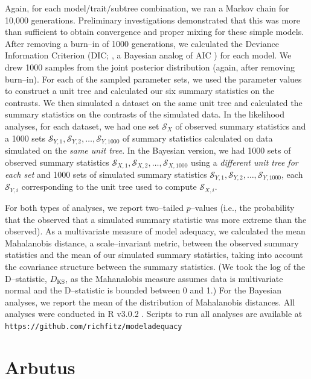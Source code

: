 \documentclass[a4paper,12pt]{article}
\begin{document}
Again, for each model/trait/subtree combination, we ran a Markov chain for 10,000 generations. Preliminary investigations demonstrated that this was more than sufficient to obtain convergence and proper mixing for these simple models. After removing a burn--in of 1000 generations, we calculated the Deviance Information Criterion (DIC; \citep{dic}, a Bayesian analog of AIC \citep{Gelman2013}) for each model. We drew 1000 samples from the joint posterior distribution (again, after removing burn--in). For each of the sampled parameter sets, we used the parameter values to construct a unit tree and calculated our six summary statistics on the contrasts. We then simulated a dataset on the same unit tree and calculated the summary statistics on the contrasts of the simulated data. In the likelihood analyses, for each dataset, we had one set $\mathcal{S}_X$ of observed summary statistics and a 1000 sets $\mathcal{S}_{Y,1}, \mathcal{S}_{Y,2}, \ldots, \mathcal{S}_{Y,1000}$ of summary statistics calculated on data simulated on the \emph{same unit tree}. In the Bayesian version, we had 1000 sets of observed summary statistics $\mathcal{S}_{X,1}, \mathcal{S}_{X,2}, \ldots, \mathcal{S}_{X,1000}$ using a \emph{different unit tree for each set} and 1000 sets of simulated summary statistics $\mathcal{S}_{Y,1}, \mathcal{S}_{Y,2}, \ldots, \mathcal{S}_{Y,1000}$, each $\mathcal{S}_{Y,i}$ corresponding to the unit tree used to compute $\mathcal{S}_{X,i}$.
 
For both types of analyses, we report two--tailed $p$--values (i.e., the probability that the observed that a simulated summary statistic was more extreme than the observed). As a multivariate measure of model adequacy, we calculated the mean Mahalanobis distance, a scale--invariant metric, between the observed summary statistics and the mean of our simulated summary statistics, taking into account the covariance structure between the summary statistics. (We took the log of the  D--statistic, $D_{\text{KS}}$, as the Mahanalobis measure assumes data is multivariate normal and the D--statistic is bounded between 0 and 1.) For the Bayesian analyses, we report the mean of the distribution of Mahalanobis distances. All analyses were conducted in R v3.0.2 \citep{R}. Scripts to run all analyses are available at \texttt{https://github.com/richfitz/modeladequacy}

\section{Arbutus}
\end{document}
